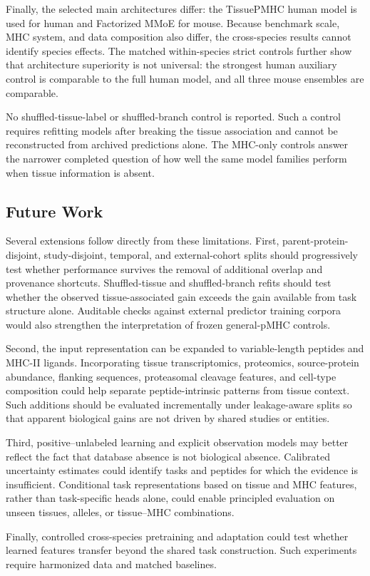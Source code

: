 Finally, the selected main architectures differ: the TissuePMHC human model is used for human and Factorized MMoE for mouse. Because benchmark scale, MHC system, and data composition also differ, the cross-species results cannot identify species effects. The matched within-species strict controls further show that architecture superiority is not universal: the strongest human auxiliary control is comparable to the full human model, and all three mouse ensembles are comparable.

No shuffled-tissue-label or shuffled-branch control is reported. Such a control requires refitting models after breaking the tissue association and cannot be reconstructed from archived predictions alone. The MHC-only controls answer the narrower completed question of how well the same model families perform when tissue information is absent.

\subsection{Future Work}

Several extensions follow directly from these limitations. First, parent-protein-disjoint, study-disjoint, temporal, and external-cohort splits should progressively test whether performance survives the removal of additional overlap and provenance shortcuts. Shuffled-tissue and shuffled-branch refits should test whether the observed tissue-associated gain exceeds the gain available from task structure alone. Auditable checks against external predictor training corpora would also strengthen the interpretation of frozen general-pMHC controls.

Second, the input representation can be expanded to variable-length peptides and MHC-II ligands. Incorporating tissue transcriptomics, proteomics, source-protein abundance, flanking sequences, proteasomal cleavage features, and cell-type composition could help separate peptide-intrinsic patterns from tissue context. Such additions should be evaluated incrementally under leakage-aware splits so that apparent biological gains are not driven by shared studies or entities.

Third, positive--unlabeled learning and explicit observation models may better reflect the fact that database absence is not biological absence. Calibrated uncertainty estimates could identify tasks and peptides for which the evidence is insufficient. Conditional task representations based on tissue and MHC features, rather than task-specific heads alone, could enable principled evaluation on unseen tissues, alleles, or tissue--MHC combinations.

Finally, controlled cross-species pretraining and adaptation could test whether learned features transfer beyond the shared task construction. Such experiments require harmonized data and matched baselines.
